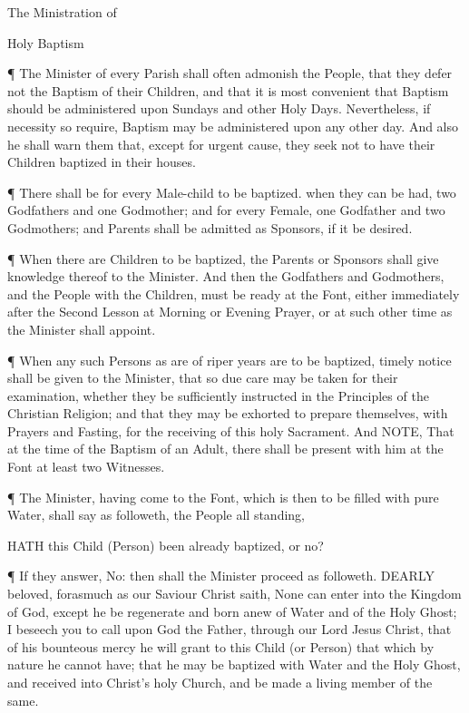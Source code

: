 The Ministration of

Holy Baptism
 

¶ The Minister of every Parish shall often admonish the People, that they defer not the Baptism of their Children, and that it is most convenient that Baptism should be administered upon Sundays and other Holy Days. Nevertheless, if necessity so require, Baptism may be administered upon any other day. And also he shall warn them that, except for urgent cause, they seek not to have their Children baptized in their houses.

¶ There shall be for every Male-child to be baptized. when they can be had, two Godfathers and one Godmother; and for every Female, one Godfather and two Godmothers; and Parents shall be admitted as Sponsors, if it be desired.

¶ When there are Children to be baptized, the Parents or Sponsors shall give knowledge thereof to the Minister. And then the Godfathers and Godmothers, and the People with the Children, must be ready at the Font, either immediately after the Second Lesson at Morning or Evening Prayer, or at such other time as the Minister shall appoint.

¶ When any such Persons as are of riper years are to be baptized, timely notice shall be given to the Minister, that so due care may be taken for their examination, whether they be sufficiently instructed in the Principles of the Christian Religion; and that they may be exhorted to prepare themselves, with Prayers and Fasting, for the receiving of this holy Sacrament. And NOTE, That at the time of the Baptism of an Adult, there shall be present with him at the Font at least two Witnesses. 

    ¶ The Minister, having come to the Font, which is then to be filled with pure Water, shall say as followeth, the People all standing,
 
HATH this Child (Person) been already baptized, or no? 
 
 
¶ If they answer, No: then shall the Minister proceed as followeth.
DEARLY beloved, forasmuch as our Saviour Christ saith, None can enter into the Kingdom of God, except he be regenerate and born anew of Water and of the Holy Ghost; I beseech you to call upon God the Father, through our Lord Jesus Christ, that of his bounteous mercy he will grant to this Child (or Person) that which by nature he cannot have; that he may be baptized with Water and the Holy Ghost, and received into Christ’s holy Church, and be made a living member of the same.


